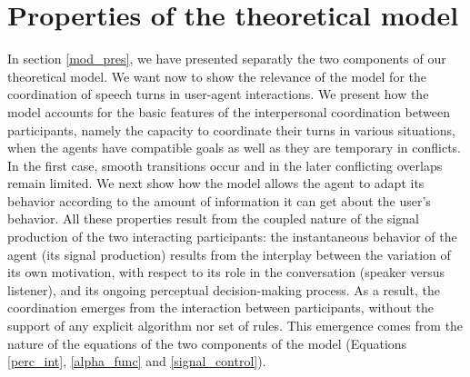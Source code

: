 \section{Properties of the theoretical model}
\label{mod_analysis}

In section \ref{mod_pres}, we have presented separatly the two components of our theoretical model. 
We want now to show the relevance of the model for the coordination of speech turns in user-agent interactions.
We present how the model accounts for the basic features of the interpersonal coordination between participants, namely the capacity to coordinate their turns in various situations, when the agents have compatible goals as well as they are temporary in conflicts. In the first case, smooth transitions occur and in the later conflicting overlaps remain limited.
We next show how the model allows the agent to adapt its behavior according to the amount of information it can get about the user's behavior.
All these properties result from the coupled nature of the signal production of the two interacting participants: the instantaneous behavior of the agent (its signal production) results from the interplay between the variation of its own motivation, with respect to its role in the conversation (speaker versus listener), and its ongoing perceptual decision-making process. 
As a result, the coordination emerges from the interaction between participants, without the support of any explicit algorithm nor set of rules.
This emergence comes from the nature of the equations of the two components of the model (Equations \ref{perc_int}, \ref{alpha_func} and \ref{signal_control}). 


